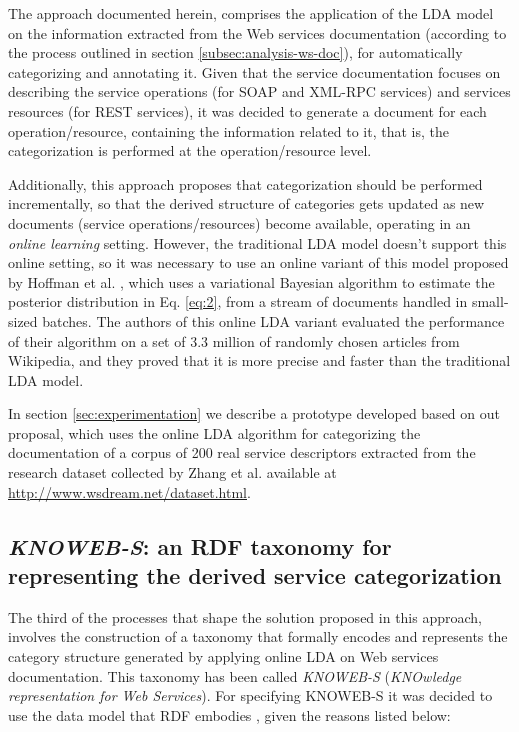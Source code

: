 The approach documented herein, comprises the application of the LDA model on the information extracted from the Web services documentation (according to the process outlined in section \ref{subsec:analysis-ws-doc}), for automatically categorizing and annotating it. Given that the service documentation focuses on describing the service operations (for SOAP and XML-RPC services) and services resources (for REST services), it was decided to generate a document for each operation/resource, containing the information related to it, that is, the categorization is performed at the operation/resource level.

Additionally, this approach proposes that categorization should be performed incrementally, so that the derived structure of categories gets updated as new documents (service operations/resources) become available, operating in an \emph{online learning} setting. However, the traditional LDA model doesn't support this online setting, so it was necessary to use an online variant of this model proposed by Hoffman et al. \cite{Hoffman:2010}, which uses a variational Bayesian algorithm to estimate the posterior distribution in Eq. \ref{eq:2}, from a stream of documents handled in small-sized batches. The authors of this online LDA variant evaluated the performance of their algorithm on a set of 3.3 million of randomly chosen articles from Wikipedia, and they proved that it is more precise and faster than the traditional LDA model.

In section \ref{sec:experimentation} we describe a prototype developed based on out proposal, which uses the online LDA algorithm for categorizing the documentation of a corpus of 200 real service descriptors extracted from the research dataset collected by Zhang et al. \cite{Zhang:2010} available at \href{http://www.wsdream.net/dataset.html}{http://www.wsdream.net/dataset.html}. 

\subsection{\emph{KNOWEB-S}: an RDF taxonomy for representing the derived service categorization}
\label{subsec:KNOWEB-S-RDF}

The third of the processes that shape the solution proposed in this approach, involves the construction of a taxonomy that formally encodes and represents the category structure generated by applying online LDA on Web services documentation. This taxonomy has been called \emph{KNOWEB-S} (\emph{KNOwledge representation for Web Services}). For specifying KNOWEB-S it was decided to use the data model that RDF embodies \cite{W3C:2004}, given the reasons listed below:


